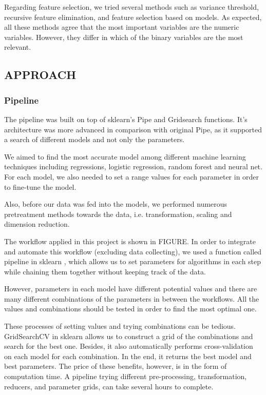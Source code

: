 Regarding feature selection, we tried several methods such as variance threshold, recursive feature elimination, and feature selection based on models. As expected, all these methods agree that the most important variables are the numeric variables. However, they differ in which of the binary variables are the most relevant.



\subsection{APPROACH}
\subsubsection{Pipeline}
The pipeline was built on top of sklearn’s Pipe and Gridsearch functions. It’s architecture was more advanced in comparison with original Pipe, as it supported a search of different models and not only the parameters.

We aimed to find the most accurate model among different machine learning techniques including regressions, logistic regression, random forest and neural net. For each model, we also needed to set a range values for each parameter in order to fine-tune the model.
 
Also, before our data was fed into the models, we performed numerous pretreatment methods towards the data, i.e. transformation, scaling and dimension reduction.
 
The workflow applied in this project is shown in FIGURE. In order to integrate and automate this workflow (excluding data collecting), we used a function called pipeline in sklearn \cite{sklearnpipeline}, which allows us to set parameters for algorithms in each step while chaining them together without keeping track of the data.


However, parameters in each model have different potential values and there are many different combinations of the parameters in between the workflows. All the values and combinations should be tested in order to find the most optimal one.
 
These processes of setting values and trying combinations can be tedious. GridSearchCV in sklearn allows us to construct a grid of the combinations and search for the best one. Besides, it also automatically performs cross-validation on each model for each combination. In the end, it returns the best model and best parameters. The price of these benefits, however, is in the form of computation time. A pipeline trying different pre-processing, transformation, reducers, and parameter grids,  can take several hours to complete. 



